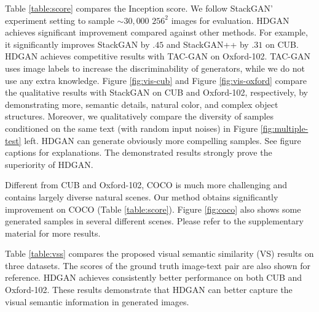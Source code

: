 \documentclass[10pt,twocolumn,letterpaper]{article}
\begin{document}
Table \ref{table:score} compares the Inception score. We follow StackGAN' experiment setting to sample ${\sim}30,000$ $256^2$ images for evaluation.
HDGAN achieves significant improvement compared against other methods. For example, it significantly improves StackGAN by $.45$ and StackGAN++ by $.31$ on CUB.
HDGAN achieves competitive results with TAC-GAN on Oxford-102. TAC-GAN uses image labels to increase the discriminability of generators, while we do not use any extra knowledge. Figure \ref{fig:vis-cub} and Figure \ref{fig:vis-oxford} compare the qualitative results with StackGAN on CUB and Oxford-102, respectively, by demonstrating more, semantic details, natural color, and complex object structures. 
Moreover, we qualitatively compare the diversity of samples conditioned on the same text (with random input noises) in Figure \ref{fig:multiple-test} left. HDGAN can generate obviously more compelling samples. See figure captions for explanations. The demonstrated results strongly prove the superiority of HDGAN. 

Different from CUB and Oxford-102, COCO is much more challenging and contains largely diverse natural scenes. 
Our method obtains significantly improvement on COCO (Table \ref{table:score}). 
Figure \ref{fig:coco} also shows some generated samples in several different scenes.
Please refer to the supplementary material for more results. 


Table \ref{table:vss} compares the proposed visual semantic similarity (VS) results on three datasets. The scores of the ground truth image-text pair are also shown for reference.  HDGAN achieves consistently better performance on both CUB and Oxford-102. These results demonstrate that HDGAN can better capture the visual semantic information in generated images. 


\end{document}
